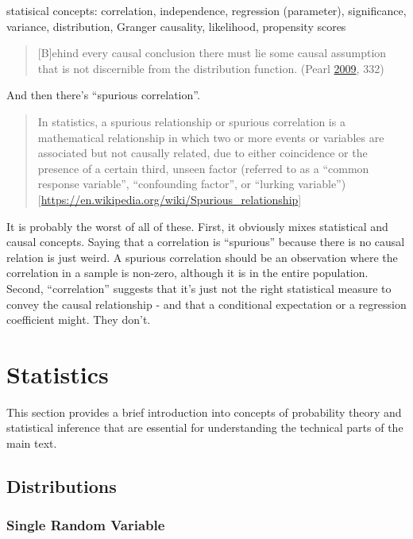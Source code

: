 \documentclass[
]{book}
\theoremstyle{definition}
\theoremstyle{definition}
\theoremstyle{definition}
\theoremstyle{remark}
\begin{document}
statisical concepts:
correlation, independence, regression (parameter), significance, variance, distribution, Granger causality, likelihood, propensity scores

\begin{quote}
{[}B{]}ehind every causal conclusion there must lie some causal assumption that is not discernible from the distribution function. (Pearl \protect\hyperlink{ref-pearl2009}{2009}, 332)
\end{quote}

And then there's ``spurious correlation''.

\begin{quote}
In statistics, a spurious relationship or spurious correlation is a mathematical relationship in which two or more events or variables are associated but not causally related, due to either coincidence or the presence of a certain third, unseen factor (referred to as a ``common response variable'', ``confounding factor'', or ``lurking variable'') {[}\url{https://en.wikipedia.org/wiki/Spurious_relationship}{]}
\end{quote}

It is probably the worst of all of these. First, it obviously mixes statistical and causal concepts. Saying that a correlation is ``spurious'' because there is no causal relation is just weird. A spurious correlation should be an observation where the correlation in a sample is non-zero, although it is in the entire population.
Second, ``correlation'' suggests that it's just not the right statistical measure to convey the causal relationship - and that a conditional expectation or a regression coefficient might. They don't.

\hypertarget{statistics-1}{%
\chapter{Statistics}\label{statistics-1}}

This section provides a brief introduction into concepts of probability theory and statistical inference that are essential for understanding the technical parts of the main text.

\hypertarget{distributions}{%
\section{Distributions}\label{distributions}}

\hypertarget{single-random-variable}{%
\subsection{Single Random Variable}\label{single-random-variable}}
\end{document}
